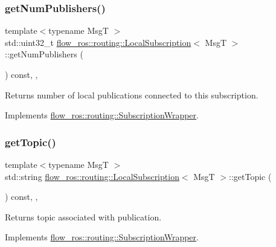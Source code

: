 \subsubsection{\texorpdfstring{get\+Num\+Publishers()}{getNumPublishers()}}
{\footnotesize\ttfamily template$<$typename MsgT $>$ \\
std\+::uint32\+\_\+t \hyperlink{classflow__ros_1_1routing_1_1_local_subscription}{flow\+\_\+ros\+::routing\+::\+Local\+Subscription}$<$ MsgT $>$\+::get\+Num\+Publishers (\begin{DoxyParamCaption}{ }\end{DoxyParamCaption}) const\hspace{0.3cm}{\ttfamily [inline]}, {\ttfamily [override]}, {\ttfamily [virtual]}}



Returns number of local publications connected to this subscription. 



Implements \hyperlink{classflow__ros_1_1routing_1_1_subscription_wrapper_a8ae55d34a07c505dc2b4bcb2440b2d32}{flow\+\_\+ros\+::routing\+::\+Subscription\+Wrapper}.

\mbox{\label{classflow__ros_1_1routing_1_1_local_subscription_a24b7dabe9dcabb93339848ae1f8dc57d}} 
\subsubsection{\texorpdfstring{get\+Topic()}{getTopic()}}
{\footnotesize\ttfamily template$<$typename MsgT $>$ \\
std\+::string \hyperlink{classflow__ros_1_1routing_1_1_local_subscription}{flow\+\_\+ros\+::routing\+::\+Local\+Subscription}$<$ MsgT $>$\+::get\+Topic (\begin{DoxyParamCaption}{ }\end{DoxyParamCaption}) const\hspace{0.3cm}{\ttfamily [inline]}, {\ttfamily [override]}, {\ttfamily [virtual]}}



Returns topic associated with publication. 



Implements \hyperlink{classflow__ros_1_1routing_1_1_subscription_wrapper_a2ef27475e7b7d7555e90d02cdc220b88}{flow\+\_\+ros\+::routing\+::\+Subscription\+Wrapper}.

